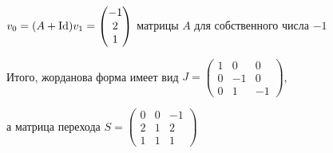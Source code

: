 \documentclass[12pt]{article}
\begin{document}
\begin{Example}{}
    $v_0 = (A + \operatorname{Id})v_1 = \begin{pmatrix}
        -1 \\
        2 \\
        1
    \end{pmatrix}$ матрицы $A$ для собственного числа $-1$

    Итого, жорданова форма имеет вид $J = \begin{pmatrix}
        1 & 0 & 0 \\
        0 & -1 & 0 \\
        0 & 1 & -1
    \end{pmatrix}$, 
    
    а матрица перехода $S = \begin{pmatrix}
        0 & 0 & -1 \\
        2 & 1 & 2 \\
        1 & 1 & 1
    \end{pmatrix}$
\end{Example}
\end{document}
